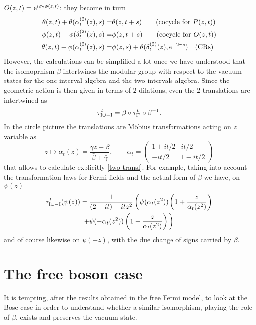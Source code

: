  $O(z,t)=\operatorname{e}^{i\sigma_2 \phi(z,t)}$: they become in turn
 \begin{align}
 \theta(z,t) + \theta(\alpha^{(2)}_{t}(z),s)=&
 \theta(z,t+s)\qquad\textrm{(cocycle for $P(z,t)$)}\\
 \phi(z,t) + \phi(\delta^{(2)}_{t}(z),s)=&
 \phi(z,t+s)\qquad\textrm{(cocycle for $O(z,t)$)}\\
 \theta(z,t) + \phi(\alpha^{(2)}_{t}(z),s)=&
 \phi(z,s) + \theta(\delta^{(2)}_{t}(z), \operatorname{e}^{-2\pi s})
 \quad\textrm{(CRs)}
 \end{align}
 However, the calculations can be simplified a lot once we 
 have understood that the isomoprhism $\beta$ intertwines the 
 modular group with respect to the vacuum states for the 
 one-interval algebra and the two-intervals algebra. Since 
 the geometric action is then given in terms of $2$-dilations,
 even the $2$-translations are intertwined as
 \begin{equation}
 \label{two-transl}
 \tau^t_{\textrm{I}\cup -\textrm{I}}=\beta\circ\tau^t_{\textrm{I}^2}\circ\beta^{-1}.
 \end{equation}
 In the circle picture the translations are M\"obius 
 transformations acting on $z$ variable as
 \[ 
 z\mapsto\alpha_t(z)=\frac{\gamma z + \beta}
 {\bar{\beta}+\bar{\gamma}},
 \qquad
 \alpha_t=
  \begin{pmatrix}
  1+it/2 &it/2\\
  -it/2& 1-it/2
  \end{pmatrix}
 \]
 that allows to calculate explicitly \eqref{two-transl}.
 For example, taking into account the transformation laws
 for Fermi fields and the actual form of $\beta$ we have, on $\psi(z)$
 \begin{multline}
 \tau^t_{\textrm{I}\cup -\textrm{I}}(\psi(z))=\frac{1}{(2-it)-itz^2}\,\bigg(
 \psi(\alpha_t(z^2))\left(1+\frac{z}{\alpha_t(z^2)}\right)\\
 +\psi(-\alpha_t(z^2))\left(1-\frac{z}{\alpha_t(z^2)}\right)\bigg)
 \end{multline}
 and of course likewise on $\psi(-z)$, with the due change of 
 signs carried by $\beta$.
 
 



 \section{The free boson case}
 \label{free boson}
 It is tempting, after the results obtained in the free
 Fermi model, to look at the Bose case in order to understand
 whether a similar isomorphism, playing the role of $\beta$, 
 exists and preserves the vacuum state.  
 

